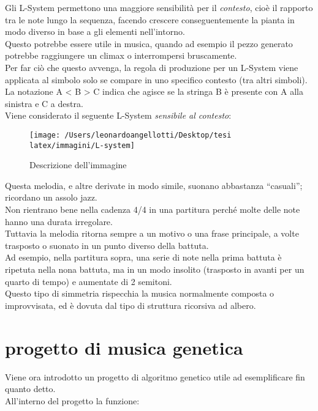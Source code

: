 \documentclass[a4paper,12pt]{report}
\begin{document}
Gli L-System permettono una maggiore sensibilità per il \textit{contesto}, cioè il rapporto tra le note lungo la sequenza, 
facendo crescere conseguentemente la pianta in modo diverso in base a gli elementi nell'intorno. \\
Questo potrebbe essere utile in musica, quando ad esempio il pezzo generato potrebbe raggiungere un climax o interrompersi bruscamente. \\
Per far ciò che questo avvenga, la regola di produzione per un L-System viene applicata al simbolo solo se compare in uno specifico
contesto (tra altri simboli). \\
La notazione A < B > C indica che agisce se la stringa B è presente con A alla sinistra e C a destra. \\
Viene considerato il seguente L-System \textit{sensibile al contesto}: 

\begin{figure}[h!]
    \centering
    \texttt{[image: /Users/leonardoangellotti/Desktop/tesi latex/immagini/L-system]} 
    \caption{Descrizione dell'immagine}
    \label{fig:immagine}
\end{figure}

Questa melodia, e altre derivate in modo simile, suonano abbastanza “casuali”; ricordano un assolo jazz. \\
Non rientrano bene nella cadenza 4/4 in una partitura perché molte delle note hanno una durata irregolare. \\
Tuttavia la melodia ritorna sempre a un motivo o una frase principale, a volte trasposto o suonato in un punto diverso della battuta. \\
Ad esempio, nella partitura sopra, una serie di note nella prima battuta è ripetuta nella nona battuta, ma in un modo insolito (trasposto in avanti per un quarto di tempo) e aumentate di 2 semitoni. \\
Questo tipo di simmetria rispecchia la musica normalmente composta o improvvisata, ed è dovuta dal tipo di struttura ricorsiva ad albero. 

\chapter{progetto di musica genetica}

Viene ora introdotto un progetto di algoritmo genetico utile ad esemplificare fin quanto detto. \\
All'interno del progetto la funzione:
\end{document}
